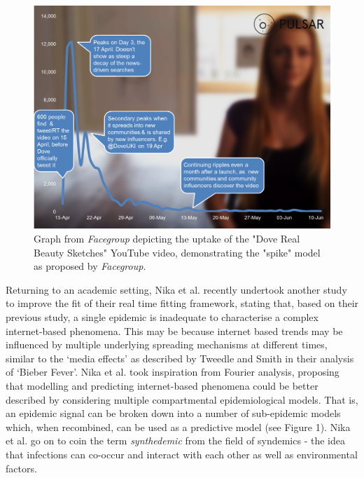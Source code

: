 \documentclass[11pt, a4paper, oneside,titlepage]{article}
\begin{document}
\begin{figure}[ht!]
\centering
\includegraphics[width=120mm]{facegroup.png}
\caption{Graph from \emph{Facegroup} depicting the uptake of the "Dove Real Beauty Sketches" YouTube video, demonstrating the "spike" model as proposed by \emph{Facegroup}.\cite{facegroup}}
\label{sir}
\end{figure}
\newpage
Returning to an academic setting, Nika et al. recently undertook
another study to improve the fit of their real time fitting framework,
stating that, based on their previous study, a single epidemic is
inadequate to characterise a complex internet-based phenomena. This
may be because internet based trends may be influenced by multiple
underlying spreading mechanisms at different times, similar to the
`media effects' as described by Tweedle and Smith in their analysis of
`Bieber Fever'. Nika et al. took inspiration from Fourier analysis,
proposing that modelling and predicting internet-based phenomena could
be better described by considering multiple compartmental
epidemiological models. That is, an epidemic signal can be broken down
into a number of sub-epidemic models which, when recombined, can be
used as a predictive model (see Figure 1). Nika et al. go on to coin
the term \emph{synthedemic} from the field of syndemics - the idea
that infections can co-occur and interact with each other as well as
environmental factors. 
\end{document}
